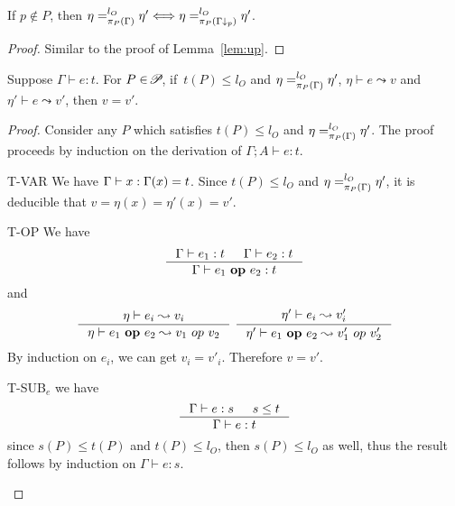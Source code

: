{{{\begin{lemma}\label{lem:down}
If $p \notin P$, then $\eta =_{\app{\Gamma}{P}}^{l_{O}} \eta' \Longleftrightarrow \eta =_{\app{\Gamma\downarrow_{p}}{P}}^{l_{O}} \eta'$.
\end{lemma}
\begin{proof}
Similar to the proof of Lemma~\ref{lem:up}.
\end{proof}



\begin{lemma}\label{lem:expsafe}
Suppose $\Gamma\vdash e : t$. For $P\in\PPS$, if~$t(P)\leq l_{O}$ and
$\eta =_{\app{\Gamma}{P}}^{l_{O}} \eta'$,  $\eta\vdash e\leadsto v$ and $\eta'\vdash e\leadsto v'$, then $v = v'$.
\end{lemma}
\begin{proof}
Consider any $P$ which satisfies $t(P)\leq l_{O}$ and $\eta =_{\app{\Gamma}{P}}^{l_{O}} \eta'$.
The proof proceeds by induction on the derivation
of $\Gamma;A \vdash e : t$.
\begin{ProofEnumDesc}
\item[T-VAR] We have $\Gamma \vdash \leVAR{x} :\Gamma(x) = t$.
Since $t(P) \leq l_{O}$ and $\eta =_{\app{\Gamma}{P}}^{l_{O}} \eta'$,
it is deducible that $v = \eta(x) = \eta'(x) = v'$.
\item[T-OP] We have
\begin{equation*}
\inference
{\Gamma \vdash e_1 : t & \Gamma \vdash e_2 : t}
{\Gamma \vdash \leOP{e_1}{e_2} : t}
\end{equation*}
and
\begin{equation*}
\inference{\eta \vdash e_i \leadsto v_i}{\eta\vdash \leOP{e_1}{e_2}\leadsto v_1~op~v_2} ~
\inference{\eta' \vdash e_i \leadsto v'_i}{\eta'\vdash \leOP{e_1}{e_2}\leadsto v'_1~op~v'_2}
\end{equation*}
By induction on $e_i$, we can get $v_i = v'_i$. Therefore $v = v'$.
\item[T-SUB$_e$] we have
\begin{equation*}
\inference
{\Gamma\vdash e : s & s \leq t}
{\Gamma\vdash e : t}
\end{equation*}
since $s(P)\leq t(P)$ and $t(P)\leq l_{O} $, then $s(P)\leq l_{O}$ as well,
thus the result follows by induction on $\Gamma\vdash e : s$.
\end{ProofEnumDesc}
\end{proof}


}}}
